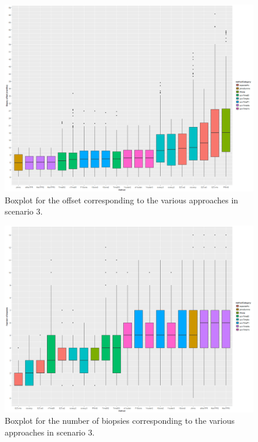 \begin{figure}[H]
\centering
\captionsetup{justification=centering}
\includegraphics[width=\textwidth]{sim_study_res_sc_8pt5_sh_3/offset_boxplot.png}
\caption{\label{fig : sc_8pt5_sh_3_offset_boxplot} Boxplot for the offset corresponding to the various approaches in scenario 3.}
\end{figure}

\begin{figure}[H]
\centering
\captionsetup{justification=centering}
\includegraphics[width=\textwidth]{sim_study_res_sc_8pt5_sh_3/nb_boxplot.png}
\caption{\label{fig : sc_8pt5_sh_3_nb_boxplot} Boxplot for the number of biopsies corresponding to the various approaches in scenario 3.}
\end{figure}

